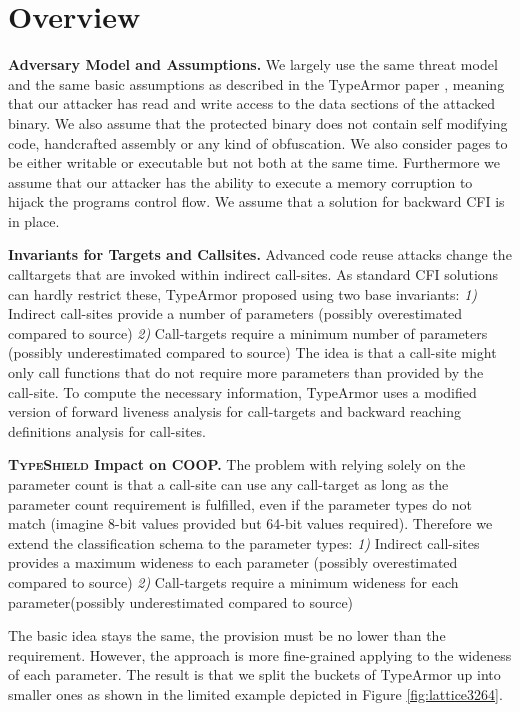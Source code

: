 \section{Overview}
\label{chapter:TypeShild Overview}

\textbf{Adversary Model and Assumptions.}
\label{Adversary Model}
We largely use the same threat model and the same basic assumptions as described in the TypeArmor 
paper \cite{veen:typearmor}, meaning that our attacker has read and write access to the data 
sections of the attacked binary.  We also assume that the protected binary does not contain 
self modifying code, handcrafted assembly or any kind of obfuscation. We also consider pages 
to be either writable or executable but not both at the same time. Furthermore we assume 
that our attacker has the ability to execute a memory corruption to hijack the programs 
control flow. We assume that a solution for backward CFI is in place.

\textbf{Invariants for Targets and Callsites.}
\label{Invariants for Targets and Callsites}
Advanced code reuse attacks change the calltargets that are invoked within indirect 
call-sites. As standard CFI solutions can hardly restrict these, TypeArmor proposed using two base invariants:
\textit{1)} Indirect call-sites provide a number of parameters (possibly overestimated compared to source)
\textit{2)} Call-targets require a minimum number of parameters (possibly underestimated compared to source)
The idea is that a call-site might only call functions that do not require more parameters than provided by the call-site. 
To compute the necessary information, TypeArmor uses a modified version of forward liveness analysis for call-targets and 
backward reaching definitions analysis for call-sites.

\textbf{\textsc{TypeShield} Impact on COOP.}
\label{TypeShild Impact on COOP}
The problem with relying solely on the parameter count is that a call-site can use any call-target as long as the parameter count 
requirement is fulfilled, even if the parameter types do not match (imagine 8-bit values provided but 64-bit values required). 
Therefore we extend the classification schema to the parameter types:
\textit{1)} Indirect call-sites provides a maximum wideness to each parameter (possibly overestimated compared to source)
\textit{2)} Call-targets require a minimum wideness for each parameter(possibly underestimated compared to source)

The basic idea stays the same, the provision must be no lower than the requirement. However, the approach is more fine-grained 
applying to the wideness of each parameter. The result is that we split the buckets of TypeArmor up into smaller ones as shown 
in the limited example depicted in Figure \ref{fig:lattice3264}.
